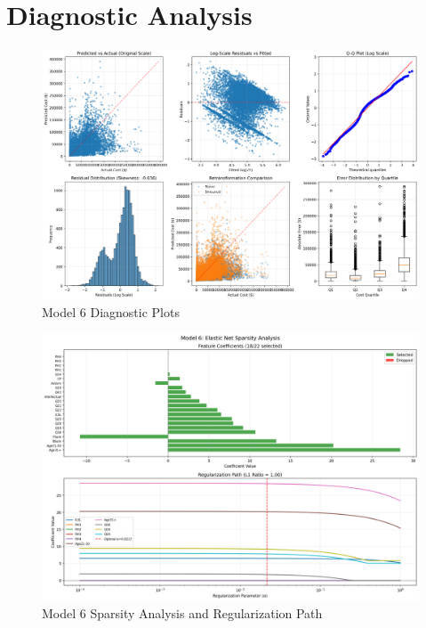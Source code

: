 \section{Diagnostic Analysis}

\begin{figure}[h]
    \centering
    \includegraphics[width=\textwidth]{models/model_6/diagnostic_plots.png}
    \caption{Model 6 Diagnostic Plots}
    \label{fig:model6_diagnostics}
\end{figure}

\begin{figure}[h]
    \centering
    \includegraphics[width=\textwidth]{models/model_6/sparsity_analysis.png}
    \caption{Model 6 Sparsity Analysis and Regularization Path}
    \label{fig:model6_sparsity}
\end{figure}

